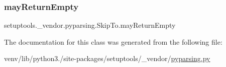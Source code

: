 \subsubsection{\texorpdfstring{may\+Return\+Empty}{mayReturnEmpty}}
{\footnotesize\ttfamily setuptools.\+\_\+vendor.\+pyparsing.\+Skip\+To.\+may\+Return\+Empty}



The documentation for this class was generated from the following file\+:\begin{DoxyCompactItemize}
\item 
venv/lib/python3./site-\/packages/setuptools/\+\_\+vendor/\hyperlink{setuptools_2__vendor_2pyparsing_8py}{pyparsing.\+py}\end{DoxyCompactItemize}
